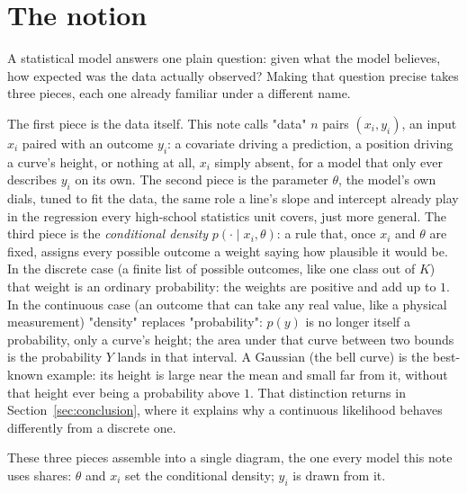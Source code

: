 \documentclass[11pt]{article}
\begin{document}
\clearpage

\tableofcontents

\clearpage

\section{The notion}
\label{sec:notion}

A statistical model answers one plain question: given what the model
believes, how expected was the data actually observed? Making that
question precise takes three pieces, each one already familiar under a
different name.

The first piece is the data itself. This note calls "data" $n$ pairs
$(x_i, y_i)$, an input $x_i$ paired with an outcome $y_i$: a covariate
driving a prediction, a position driving a curve's height, or nothing
at all, $x_i$ simply absent, for a model that only ever describes
$y_i$ on its own. The second piece is the parameter $\theta$, the
model's own dials, tuned to fit the data, the same role a line's slope
and intercept already play in the regression every high-school
statistics unit covers, just more general. The third piece is the
\emph{conditional density} $p(\cdot \mid x_i,\theta)$: a rule that,
once $x_i$ and $\theta$ are fixed, assigns every possible outcome a
weight saying how plausible it would be. In the discrete case (a
finite list of possible outcomes, like one class out of $K$) that
weight is an ordinary probability: the weights are positive and add up
to $1$. In the continuous case (an outcome that can take any real
value, like a physical measurement) "density" replaces "probability":
$p(y)$ is no longer itself a probability, only a curve's height; the
area under that curve between two bounds is the probability $Y$
lands in that interval. A Gaussian (the bell curve) is the best-known
example: its height is large near the mean and small far from it,
without that height ever being a probability above $1$. That
distinction returns in Section~\ref{sec:conclusion}, where it explains
why a continuous likelihood behaves differently from a discrete one.

These three pieces assemble into a single diagram, the one every model
this note uses shares: $\theta$ and $x_i$ set the conditional density;
$y_i$ is drawn from it.
\end{document}
